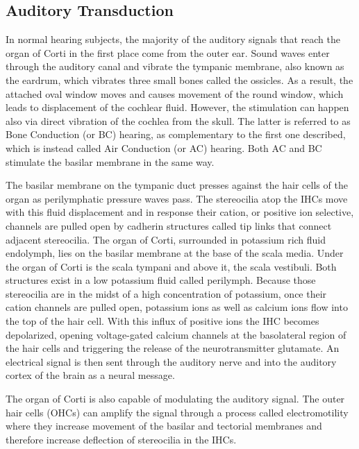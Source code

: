 \hypertarget{auditory-transduction}{%
\subsection{Auditory Transduction}\label{auditory-transduction}}

In normal hearing subjects, the majority of the auditory signals that reach the organ of Corti in the first place come from the outer ear. Sound waves enter through the auditory canal and vibrate the tympanic membrane, also known as the eardrum, which vibrates three small bones called the ossicles. As a result, the attached oval window moves and causes movement of the round window, which leads to displacement of the cochlear fluid. However, the stimulation can happen also via direct vibration of the cochlea from the skull. The latter is referred to as Bone Conduction (or BC) hearing, as complementary to the first one described, which is instead called Air Conduction (or AC) hearing. Both AC and BC stimulate the basilar membrane in the same way.

The basilar membrane on the tympanic duct presses against the hair cells of the organ as perilymphatic pressure waves pass. The stereocilia atop the IHCs move with this fluid displacement and in response their cation, or positive ion selective, channels are pulled open by cadherin structures called tip links that connect adjacent stereocilia. The organ of Corti, surrounded in potassium rich fluid endolymph, lies on the basilar membrane at the base of the scala media. Under the organ of Corti is the scala tympani and above it, the scala vestibuli. Both structures exist in a low potassium fluid called perilymph. Because those stereocilia are in the midst of a high concentration of potassium, once their cation channels are pulled open, potassium ions as well as calcium ions flow into the top of the hair cell. With this influx of positive ions the IHC becomes depolarized, opening voltage-gated calcium channels at the basolateral region of the hair cells and triggering the release of the neurotransmitter glutamate. An electrical signal is then sent through the auditory nerve and into the auditory cortex of the brain as a neural message.

The organ of Corti is also capable of modulating the auditory signal. The outer hair cells (OHCs) can amplify the signal through a process called electromotility where they increase movement of the basilar and tectorial membranes and therefore increase deflection of stereocilia in the IHCs.

